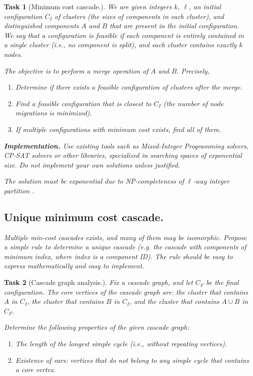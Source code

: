 \documentclass[a4paper,USenglish]{lipics-v2019}
\newtheorem{task}{Task}
\begin{document}
\begin{task}[Minimum cost cascade.]

We are given integers $k$, $\ell$, an initial configuration $C_I$ of clusters (the
sizes of components in each cluster), and distinguished components $A$ and
$B$ that are present in the initial configuration.
We say that a configuration is feasible if each component is entirely contained
in a single cluster (i.e., no component is split), and each cluster contains
exactly $k$ nodes.

The objective is to perform a merge operation of $A$ and $B$. Precisely,
\begin{enumerate}
    \item Determine if there exists a feasible configuration of clusters after
        the merge.
    \item Find a feasible configuration that is closest to $C_I$ (the number of
        node migrations is minimized).
    \item If multiple configurations with minimum cost exists, find all of them.
\end{enumerate}

\noindent
\textbf{Implementation.}
Use existing tools such as Mixed-Integer Programming solvers, CP-SAT solvers or
other libraries, specialized in searching spaces of exponential size.
Do not implement your own solutions unless justified.

\noindent The solution must be exponential due to NP-completeness of $\ell$-way integer
partition \cite{AndRae06}.
\subsection{Unique minimum cost cascade.}
Multiple min-cost cascades exists, and many of them may be isomorphic. Propose a
simple rule to determine a unique cascade (e.g. the cascade with components of
minimum index, where index is a component ID). The rule should be easy to
express mathematically and easy to implement.
\end{task}

\begin{task}[Cascade graph analysis.]

Fix a cascade graph, and let $C_F$ be the final configuration.
The \emph{core} vertices of the cascade graph are: the cluster that contains $A$
in $C_I$, the cluster that contains $B$ in $C_I$, and the cluster that contains
$A\cup B$ in $C_F$.

Determine the following properties of the given cascade graph:
\begin{enumerate}
    \item The length of the longest simple cycle (i.e., without repeating
        vertices).
    \item Existence of ears: vertices that do not belong to any simple cycle
        that contains a core vertex.
\end{enumerate}

\end{task}
\end{document}
